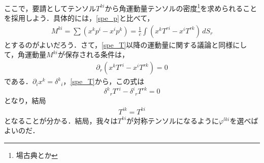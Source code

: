 \documentclass[a4paper]{ltjsreport}
\begin{document}
ここで，要請としてテンソル$T^{ki}$から角運動量テンソルの密度\footnote{場古典とか}を求められることを採用しよう．具体的には，\eqref{spe_p}と比べて，
\begin{align}
  M^{ki}=\sum\left(x^kp^i - x^ip^k\right)=\frac{1}{c}\int\left(x^kT^{ri} - x^iT^{rk}\right)\,dS_r
\end{align}
とするのがよいだろう．さて，\eqref{spe_T}以降の運動量に関する議論と同様にして，角運動量$M^{ki}$が保存される条件は，
\begin{align}
  \partial_r\left(x^kT^{ri} - x^iT^{rk}\right)=0
\end{align}
である．$\partial_ix^k={\delta^k}_i$，\eqref{spe_T}から，この式は
\[{\delta^k}_rT^{ri} - {\delta^i}_rT^{rk}=0\]
となり，結局
\begin{align}
  T^{ik}=T^{ki}
\end{align}
となることが分かる．結局，我々は$T^{ki}$が対称テンソルになるように$\varphi^{lki}$を選べばよいのだ．
\end{document}

